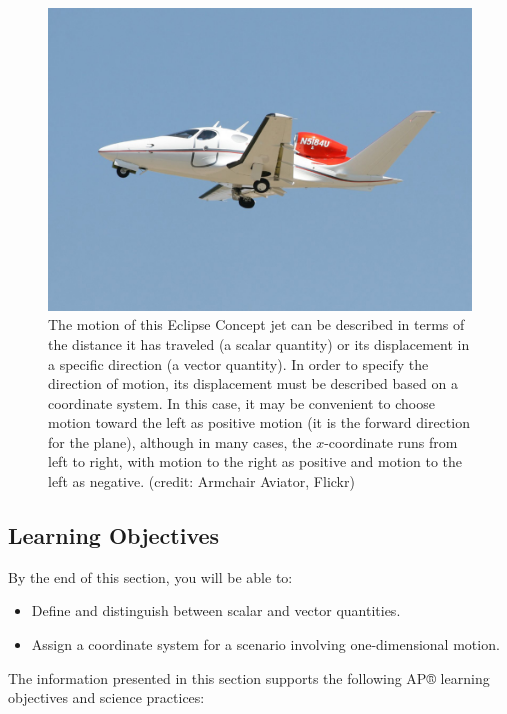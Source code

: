 \documentclass[
]{book}
\providecommand{\tightlist}{%
  \setlength{\itemsep}{0pt}\setlength{\parskip}{0pt}}
\begin{document}
\begin{figure}
\hypertarget{import-auto-id1778274}{%
\centering
\includegraphics{images/Figure_02_02_00.jpg}
\caption{The motion of this Eclipse Concept jet can be described in terms of
the distance it has traveled (a scalar quantity) or its displacement in
a specific direction (a vector quantity). In order to specify the
direction of motion, its displacement must be described based on a
coordinate system. In this case, it may be convenient to choose motion
toward the left as positive motion (it is the forward direction for the
plane), although in many cases, the \(x{}\)-coordinate runs from left to
right, with motion to the right as positive and motion to the left as
negative. (credit: Armchair Aviator,
Flickr)}\label{import-auto-id1778274}
}
\end{figure}

\hypertarget{fs-id1545372}{}
\hypertarget{learning-objectives}{%
\subsection{Learning Objectives}\label{learning-objectives}}

By the end of this section, you will be able to:

\begin{itemize}
\tightlist
\item
  Define and distinguish between scalar and vector quantities.
\item
  Assign a coordinate system for a scenario involving one-dimensional
  motion.
\end{itemize}

The information presented in this section supports the following AP®
learning objectives and science practices:
\end{document}
